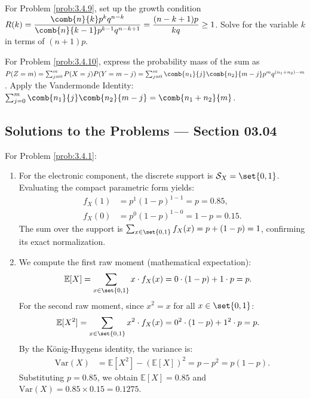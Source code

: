 \begin{sugerencia}
	\label{sug:3.4.9}
	For Problem \ref{prob:3.4.9}, set up the growth condition $R(k) = \dfrac{\comb{n}{k} p^k q^{n-k}}{\comb{n}{k-1} p^{k-1} q^{n-k+1}} = \dfrac{(n-k+1)p}{kq} \ge 1$. Solve for the variable $k$ in terms of $(n+1)p$.
\end{sugerencia}

\begin{sugerencia}
	\label{sug:3.4.10}
	For Problem \ref{prob:3.4.10}, express the probability mass of the sum as $P(Z = m) = \sum_{j=0}^m P(X = j) P(Y = m-j) = \sum_{j=0}^m \comb{n_1}{j}\comb{n_2}{m-j} p^m q^{(n_1+n_2)-m}$. Apply the Vandermonde Identity: $\sum_{j=0}^m \comb{n_1}{j}\comb{n_2}{m-j} = \comb{n_1+n_2}{m}$.
\end{sugerencia}

\subsection*{Solutions to the Problems --- Section 03.04}

\begin{solucion}
	\label{sol:3.4.1}
	For Problem \ref{prob:3.4.1}:
	\begin{enumerate}
		\item For the electronic component, the discrete support is $\mathcal{S}_X = \set{0, 1}$. Evaluating the compact parametric form yields:
		\begin{align*}
			f_X(1) &= p^1 (1-p)^{1-1} = p = 0.85, \\
			f_X(0) &= p^0 (1-p)^{1-0} = 1-p = 0.15.
		\end{align*}
		The sum over the support is $\sum_{x \in \set{0,1}} f_X(x) = p + (1-p) = 1$, confirming its exact normalization.
		\item We compute the first raw moment (mathematical expectation):
		\begin{align*}
			\mathbb{E}[X] &= \sum_{x \in \set{0,1}} x \cdot f_X(x) = 0 \cdot (1-p) + 1 \cdot p = p.
		\end{align*}
		For the second raw moment, since $x^2 = x$ for all $x \in \set{0, 1}$:
		\begin{align*}
			\mathbb{E}[X^2] &= \sum_{x \in \set{0,1}} x^2 \cdot f_X(x) = 0^2 \cdot (1-p) + 1^2 \cdot p = p.
		\end{align*}
		By the König-Huygens identity, the variance is:
		\begin{align*}
			\text{Var}(X) &= \mathbb{E}[X^2] - (\mathbb{E}[X])^2 = p - p^2 = p(1-p).
		\end{align*}
		Substituting $p = 0.85$, we obtain $\mathbb{E}[X] = 0.85$ and $\text{Var}(X) = 0.85 \times 0.15 = 0.1275$.
	\end{enumerate}
\end{solucion}

